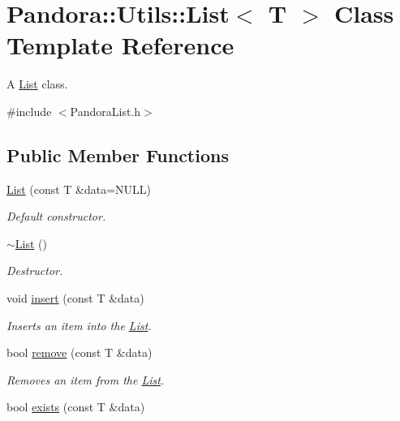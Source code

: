 \hypertarget{classPandora_1_1Utils_1_1List}{
\section{Pandora::Utils::List$<$ T $>$ Class Template Reference}
\label{classPandora_1_1Utils_1_1List}
}


A \hyperlink{classPandora_1_1Utils_1_1List}{List} class.  


{\ttfamily \#include $<$PandoraList.h$>$}\subsection*{Public Member Functions}
\begin{DoxyCompactItemize}
\item 
\hyperlink{classPandora_1_1Utils_1_1List_aca19ef1d1d19775a487e1fa55a1aeb40}{List} (const T \&data=NULL)
\begin{DoxyCompactList}\small\item\em Default constructor. \item\end{DoxyCompactList}\item 
\hyperlink{classPandora_1_1Utils_1_1List_a4014a2867a09df28421939d4732a7907}{$\sim$List} ()
\begin{DoxyCompactList}\small\item\em Destructor. \item\end{DoxyCompactList}\item 
void \hyperlink{classPandora_1_1Utils_1_1List_a613c9a325c0e2916241acbd453d7b295}{insert} (const T \&data)
\begin{DoxyCompactList}\small\item\em Inserts an item into the \hyperlink{classPandora_1_1Utils_1_1List}{List}. \item\end{DoxyCompactList}\item 
bool \hyperlink{classPandora_1_1Utils_1_1List_a045ecf8edb94f60efc41a5d864c7dca6}{remove} (const T \&data)
\begin{DoxyCompactList}\small\item\em Removes an item from the \hyperlink{classPandora_1_1Utils_1_1List}{List}. \item\end{DoxyCompactList}\item 
bool \hyperlink{classPandora_1_1Utils_1_1List_ad15fe96a79420346c975e96eb23f35ea}{exists} (const T \&data)

\end{DoxyCompactItemize}
